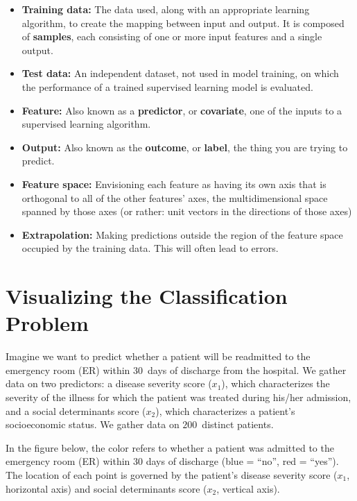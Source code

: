 \begin{itemize}
\item \textbf{Training data:} The data used, along with an appropriate learning algorithm, to create the mapping between input and output. It is composed of \textbf{samples}, each consisting of one or more input features and a single output.
\item \textbf{Test data:} An independent dataset, not used in model training, on which the performance of a trained supervised learning model is evaluated. 
\item \textbf{Feature:} Also known as a \textbf{predictor}, or \textbf{covariate}, one of the inputs to a supervised learning algorithm.
\item \textbf{Output:} Also known as the \textbf{outcome}, or \textbf{label}, the thing you are trying to predict.
\item \textbf{Feature space:} Envisioning each feature as having its own axis that is orthogonal to all of the other features' axes, the multidimensional space spanned by those axes (or rather: unit vectors in the directions of those axes)
\item \textbf{Extrapolation:} Making predictions outside the region of the feature space occupied by the training data. This will often lead to errors. 
\end{itemize}


\section{Visualizing the Classification Problem \label{section:visualizingclass}}

Imagine we want to predict whether a patient will be readmitted to the emergency room (ER) within $30$~days of discharge from the hospital. We gather data on two predictors: a disease severity score ($x_1$), which characterizes the severity of the illness for which the patient was treated during his/her admission, and a social determinants score ($x_2$), which characterizes a patient's socioeconomic status. We gather data on $200$~distinct patients.

In the figure below, the color refers to whether a patient was admitted to the emergency room (ER) within 30 days of discharge (blue = ``no'', red = ``yes''). The location of each point is governed by the patient's disease severity score ($x_1$, horizontal axis) and social determinants score ($x_2$, vertical axis).

